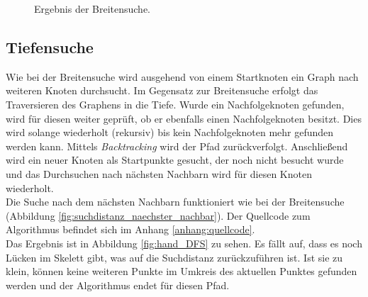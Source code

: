 \begin{figure}[htbp]
\begin{minipage}{5cm}
	\end{minipage}
	\caption{Ergebnis der Breitensuche.}
	\label{fig:hand_BFS}
	\end{figure}
\subsection{Tiefensuche}
\label{subsec:tiefensuche}
Wie bei der Breitensuche wird ausgehend von einem Startknoten ein Graph nach weiteren Knoten durchsucht. 
Im Gegensatz zur Breitensuche erfolgt das Traversieren des Graphens in die Tiefe. Wurde ein Nachfolgeknoten
gefunden, wird für diesen weiter geprüft, ob er ebenfalls einen Nachfolgeknoten besitzt. Dies wird
solange wiederholt (rekursiv) bis kein Nachfolgeknoten mehr gefunden werden kann. Mittels \emph{Backtracking} wird der Pfad zurückverfolgt. Anschließend wird ein neuer Knoten als Startpunkte gesucht, der noch nicht besucht wurde und das Durchsuchen nach nächsten Nachbarn wird für diesen Knoten wiederholt.\\
Die Suche nach dem nächsten Nachbarn funktioniert wie bei der Breitensuche (Abbildung \ref{fig:suchdistanz_naechster_nachbar}). Der Quellcode zum Algorithmus befindet sich im Anhang \ref{anhang:quellcode}. \\
Das Ergebnis ist in Abbildung \ref{fig:hand_DFS} zu sehen. Es fällt auf, dass es noch Lücken im Skelett gibt, was auf die Suchdistanz zurückzuführen ist. Ist sie zu klein, können keine weiteren Punkte im Umkreis des aktuellen Punktes gefunden werden und der Algorithmus endet für diesen Pfad. 
